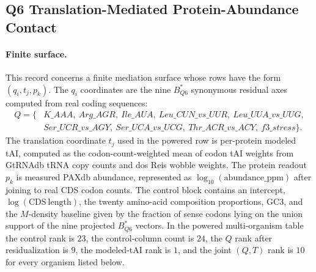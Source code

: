 \subsection{Q6 Translation-Mediated Protein-Abundance Contact}\label{subsec:q6-translation-mediated-protein-abundance-cross-layer}

\paragraph{Finite surface.}
This record concerns a finite mediation surface whose rows have the form $(q_i,t_j,p_k)$.  The $q_i$ coordinates are the nine $B^*_{Q6}$ synonymous residual axes computed from real coding sequences:
$$
\begin{aligned}
Q=\{&K\_AAA,\ Arg\_AGR,\ Ile\_AUA,\ Leu\_CUN\_vs\_UUR,\ Leu\_UUA\_vs\_UUG,\\
&Ser\_UCR\_vs\_AGY,\ Ser\_UCA\_vs\_UCG,\ Thr\_ACR\_vs\_ACY,\ f3\_stress\}.
\end{aligned}
$$
The translation coordinate $t_j$ used in the powered row is per-protein modeled tAI, computed as the codon-count-weighted mean of codon tAI weights from GtRNAdb tRNA copy counts and dos Reis wobble weights.  The protein readout $p_k$ is measured PAXdb abundance, represented as $\log_{10}(\mathrm{abundance\_ppm})$ after joining to real CDS codon counts.  The control block contains an intercept, $\log(\mathrm{CDS\ length})$, the twenty amino-acid composition proportions, GC3, and the $M$-density baseline given by the fraction of sense codons lying on the union support of the nine projected $B^*_{Q6}$ vectors.  In the powered multi-organism table the control rank is $23$, the control-column count is $24$, the $Q$ rank after residualization is $9$, the modeled-tAI rank is $1$, and the joint $(Q,T)$ rank is $10$ for every organism listed below.

